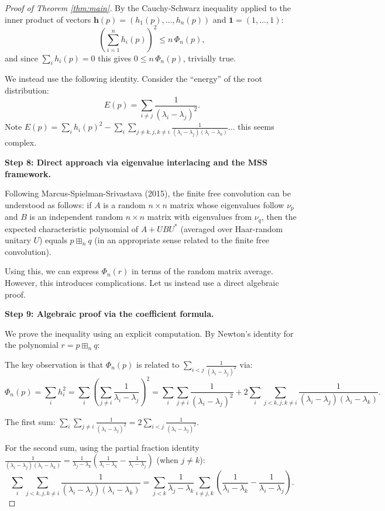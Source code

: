 \documentclass[12pt]{article}
\theoremstyle{definition}
\begin{document}
\begin{proof}[Proof of Theorem \ref{thm:main}]
By the Cauchy-Schwarz inequality applied to the inner product of vectors $\mathbf{h}(p) = (h_1(p),\ldots,h_n(p))$ and $\mathbf{1} = (1,\ldots,1)$:
$$\left(\sum_{i=1}^n h_i(p)\right)^2 \leq n\,\Phi_n(p),$$
and since $\sum_i h_i(p) = 0$ this gives $0\leq n\,\Phi_n(p)$, trivially true.

We instead use the following identity. Consider the ``energy'' of the root distribution:
$$E(p) = \sum_{i\neq j}\frac{1}{(\lambda_i-\lambda_j)^2}.$$
Note $E(p) = \sum_i h_i(p)^2 - \sum_i\sum_{j\neq k, j,k\neq i}\frac{1}{(\lambda_i-\lambda_j)(\lambda_i-\lambda_k)}$... this seems complex.

\textbf{Step 8: Direct approach via eigenvalue interlacing and the MSS framework.}

Following Marcus-Spielman-Srivastava (2015), the finite free convolution can be understood as follows: if $A$ is a random $n\times n$ matrix whose eigenvalues follow $\nu_p$ and $B$ is an independent random $n\times n$ matrix with eigenvalues from $\nu_q$, then the expected characteristic polynomial of $A+UBU^*$ (averaged over Haar-random unitary $U$) equals $p\boxplus_n q$ (in an appropriate sense related to the finite free convolution).

Using this, we can express $\Phi_n(r)$ in terms of the random matrix average. However, this introduces complications. Let us instead use a direct algebraic proof.

\textbf{Step 9: Algebraic proof via the coefficient formula.}

We prove the inequality using an explicit computation. By Newton's identity for the polynomial $r = p\boxplus_n q$:

The key observation is that $\Phi_n(p)$ is related to $\sum_{i<j}\frac{1}{(\lambda_i-\lambda_j)^2}$ via:
$$\Phi_n(p) = \sum_i h_i^2 = \sum_i\left(\sum_{j\neq i}\frac{1}{\lambda_i-\lambda_j}\right)^2 = \sum_i\sum_{j\neq i}\frac{1}{(\lambda_i-\lambda_j)^2} + 2\sum_i\sum_{j<k, j,k\neq i}\frac{1}{(\lambda_i-\lambda_j)(\lambda_i-\lambda_k)}.$$

The first sum: $\sum_i\sum_{j\neq i}\frac{1}{(\lambda_i-\lambda_j)^2} = 2\sum_{i<j}\frac{1}{(\lambda_i-\lambda_j)^2}$.

For the second sum, using the partial fraction identity $\frac{1}{(\lambda_i-\lambda_j)(\lambda_i-\lambda_k)} = \frac{1}{\lambda_j-\lambda_k}\left(\frac{1}{\lambda_i-\lambda_k}-\frac{1}{\lambda_i-\lambda_j}\right)$ (when $j\neq k$):
$$\sum_i\sum_{j<k, j,k\neq i}\frac{1}{(\lambda_i-\lambda_j)(\lambda_i-\lambda_k)} = \sum_{j<k}\frac{1}{\lambda_j-\lambda_k}\sum_{i\neq j,k}\left(\frac{1}{\lambda_i-\lambda_k}-\frac{1}{\lambda_i-\lambda_j}\right).$$


\end{proof}
\end{document}
